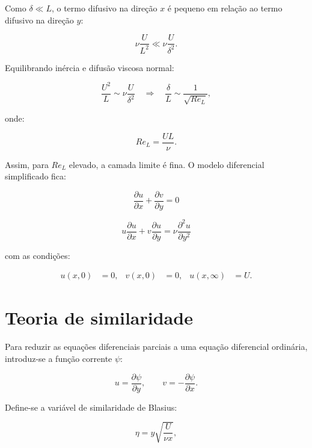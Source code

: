 \documentclass[12pt,a4paper]{article}
\begin{document}
Como $\delta \ll L$, o termo difusivo na direção $x$ é pequeno em relação ao termo difusivo na direção $y$:

\begin{equation}
    \nu\frac{U}{L^2} \ll \nu\frac{U}{\delta^2}.
\end{equation}

Equilibrando inércia e difusão viscosa normal:

\begin{equation}
    \frac{U^2}{L} \sim \nu\frac{U}{\delta^2}
    \quad \Rightarrow \quad
    \frac{\delta}{L} \sim \frac{1}{\sqrt{Re_L}},
\end{equation}

onde:

\begin{equation}
    Re_L = \frac{UL}{\nu}.
\end{equation}

Assim, para $Re_L$ elevado, a camada limite é fina. O modelo diferencial simplificado fica:

\begin{equation}
    \boxed{\frac{\partial u}{\partial x} + \frac{\partial v}{\partial y} = 0}
\end{equation}

\begin{equation}
    \boxed{u\frac{\partial u}{\partial x} + v\frac{\partial u}{\partial y}
    = \nu\frac{\partial^2 u}{\partial y^2}}
\end{equation}

com as condições:

\begin{align}
    u(x,0)&=0, & v(x,0)&=0, & u(x,\infty)&=U.
\end{align}

\section{Teoria de similaridade}

Para reduzir as equações diferenciais parciais a uma equação diferencial ordinária, introduz-se a função corrente $\psi$:

\begin{equation}
    u = \frac{\partial \psi}{\partial y}, \qquad
    v = -\frac{\partial \psi}{\partial x}.
\end{equation}

Define-se a variável de similaridade de Blasius:

\begin{equation}
    \eta = y\sqrt{\frac{U}{\nu x}},
\end{equation}
\end{document}
